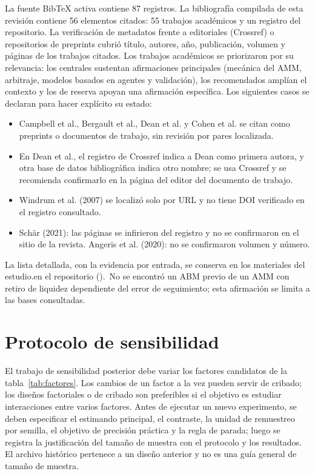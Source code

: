 La fuente BibTeX activa contiene 87 registros. La bibliografía compilada de esta revisión contiene 56 elementos citados: 55 trabajos académicos y un registro del repositorio. La verificación de metadatos frente a editoriales (Crossref) o repositorios de preprints cubrió título, autores, año, publicación, volumen y páginas de los trabajos citados. Los trabajos académicos se priorizaron por su relevancia: los centrales sustentan afirmaciones principales (mecánica del AMM, arbitraje, modelos basados en agentes y validación), los recomendados amplían el contexto y los de reserva apoyan una afirmación específica. Los siguientes casos se declaran para hacer explícito su estado:

\begin{itemize}
  \item Campbell et al., Bergault et al., Dean et al. y Cohen et al. se citan como preprints o documentos de trabajo, sin revisión por pares localizada.
  \item En Dean et al., el registro de Crossref indica a Dean como primera autora, y otra base de datos bibliográfica indica otro nombre; se usa Crossref y se recomienda confirmarlo en la página del editor del documento de trabajo.
  \item Windrum et al. (2007) se localizó solo por URL y no tiene DOI verificado en el registro consultado.
  \item Schär (2021): las páginas se infirieron del registro y no se confirmaron en el sitio de la revista. Angeris et al. (2020): no se confirmaron volumen y número.
\end{itemize}

La lista detallada, con la evidencia por entrada, se conserva \ifdefined\blindreviewmode en los materiales del estudio.\else en el repositorio ().\fi\ No se encontró un ABM previo de un AMM con retiro de liquidez dependiente del error de seguimiento; esta afirmación se limita a las bases consultadas.

\section{Protocolo de sensibilidad}
\label{sec:sensibilidad}

El trabajo de sensibilidad posterior debe variar los factores candidatos de la tabla~\ref{tab:factores}. Los cambios de un factor a la vez pueden servir de cribado; los diseños factoriales o de cribado \cite{morris1991factorial,saltelli2010variance} son preferibles si el objetivo es estudiar interacciones entre varios factores. Antes de ejecutar un nuevo experimento, se deben especificar el estimando principal, el contraste, la unidad de remuestreo por semilla, el objetivo de precisión práctica y la regla de parada; luego se registra la justificación del tamaño de muestra con el protocolo y los resultados. El archivo histórico  pertenece a un diseño anterior y no es una guía general de tamaño de muestra.

